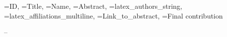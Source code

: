 \documentclass[a4paper,12pt]{article}
\begin{document}
\newpage


  {\ID=ID,
  \Title=Title, 
  \Name=Name, 
  \Abstract=Abstract, 
  \Authors=latex_authors_string, 
  \Affiliations=latex_affiliations_multiline,
  \URL=Link_to_abstract,
  \Contribution=Final contribution}
  {
    \label{abs:\ID}

    \begin{center}
      {\Large \textsc{\Contribution} -- \Title \par}
    \end{center}

    {\noindent \large \Authors \par \vspace{.5em}}

    {\noindent \small \Affiliations \par \vspace{1em}}

    {\noindent \Abstract \par \vspace{1em}}

    {\centering \href{\URL}{\URL} \par}

    \newpage
  }

\end{document}
